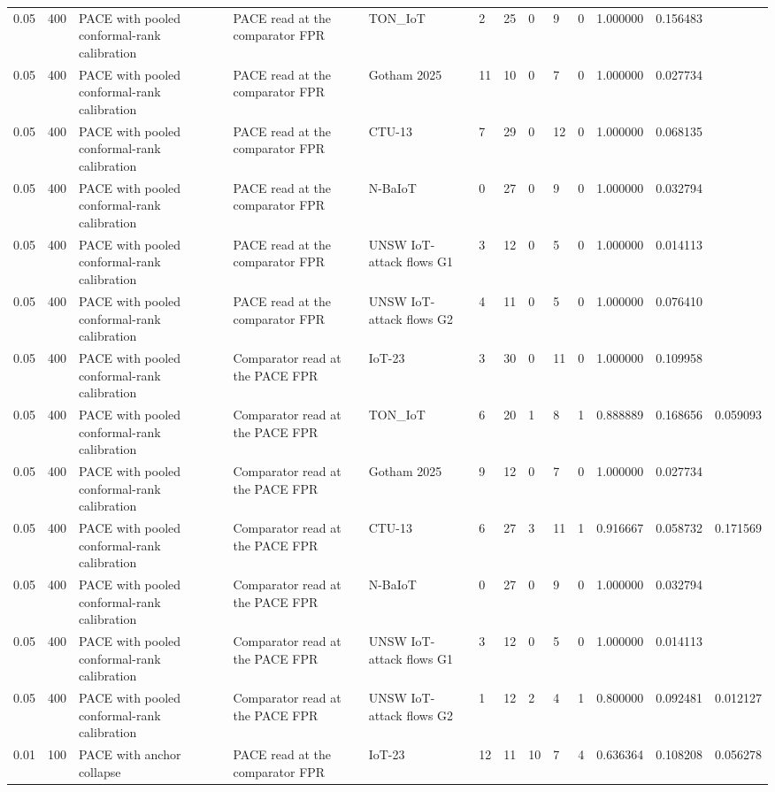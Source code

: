 \begin{tabular}{lllllllllllll}
0.05 & 400 & PACE with pooled conformal-rank calibration & PACE read at the comparator FPR & TON\_IoT & 2 & 25 & 0 & 9 & 0 & 1.000000 & 0.156483 &  \\
0.05 & 400 & PACE with pooled conformal-rank calibration & PACE read at the comparator FPR & Gotham 2025 & 11 & 10 & 0 & 7 & 0 & 1.000000 & 0.027734 &  \\
0.05 & 400 & PACE with pooled conformal-rank calibration & PACE read at the comparator FPR & CTU-13 & 7 & 29 & 0 & 12 & 0 & 1.000000 & 0.068135 &  \\
0.05 & 400 & PACE with pooled conformal-rank calibration & PACE read at the comparator FPR & N-BaIoT & 0 & 27 & 0 & 9 & 0 & 1.000000 & 0.032794 &  \\
0.05 & 400 & PACE with pooled conformal-rank calibration & PACE read at the comparator FPR & UNSW IoT-attack flows G1 & 3 & 12 & 0 & 5 & 0 & 1.000000 & 0.014113 &  \\
0.05 & 400 & PACE with pooled conformal-rank calibration & PACE read at the comparator FPR & UNSW IoT-attack flows G2 & 4 & 11 & 0 & 5 & 0 & 1.000000 & 0.076410 &  \\
0.05 & 400 & PACE with pooled conformal-rank calibration & Comparator read at the PACE FPR & IoT-23 & 3 & 30 & 0 & 11 & 0 & 1.000000 & 0.109958 &  \\
0.05 & 400 & PACE with pooled conformal-rank calibration & Comparator read at the PACE FPR & TON\_IoT & 6 & 20 & 1 & 8 & 1 & 0.888889 & 0.168656 & 0.059093 \\
0.05 & 400 & PACE with pooled conformal-rank calibration & Comparator read at the PACE FPR & Gotham 2025 & 9 & 12 & 0 & 7 & 0 & 1.000000 & 0.027734 &  \\
0.05 & 400 & PACE with pooled conformal-rank calibration & Comparator read at the PACE FPR & CTU-13 & 6 & 27 & 3 & 11 & 1 & 0.916667 & 0.058732 & 0.171569 \\
0.05 & 400 & PACE with pooled conformal-rank calibration & Comparator read at the PACE FPR & N-BaIoT & 0 & 27 & 0 & 9 & 0 & 1.000000 & 0.032794 &  \\
0.05 & 400 & PACE with pooled conformal-rank calibration & Comparator read at the PACE FPR & UNSW IoT-attack flows G1 & 3 & 12 & 0 & 5 & 0 & 1.000000 & 0.014113 &  \\
0.05 & 400 & PACE with pooled conformal-rank calibration & Comparator read at the PACE FPR & UNSW IoT-attack flows G2 & 1 & 12 & 2 & 4 & 1 & 0.800000 & 0.092481 & 0.012127 \\
0.01 & 100 & PACE with anchor collapse & PACE read at the comparator FPR & IoT-23 & 12 & 11 & 10 & 7 & 4 & 0.636364 & 0.108208 & 0.056278 \\

\end{tabular}
